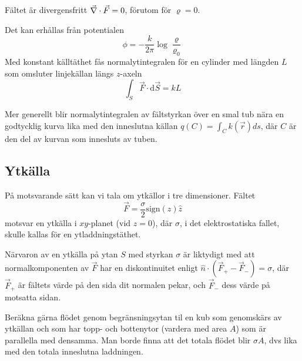 \documentclass[%
oneside,                 %
final,                   %
10pt]{article}
\newenvironment{warning_mdfboxadmon}[1][]{
\begin{warning_mdfboxmdframed}[frametitle=#1]
}
{
\end{warning_mdfboxmdframed}
}
\begin{document}
Fältet är divergensfritt $\vec{\nabla} \cdot \vec{F} = 0$, förutom för $\varrho=0$.

Det kan erhållas från potentialen 
\begin{equation}
	\phi=-\frac{k}{2\pi}\log\frac{\varrho}{\varrho_0}
\end{equation}
Med konstant källtäthet fås normalytintegralen för en cylinder med längden $L$ som omsluter linjekällan längs $z$-axeln
\begin{equation}
	\int_S \vec{F} \cdot \mbox{d}\vec{S} = k L
\end{equation}


\begin{warning_mdfboxadmon}[Kommentar]
Mer generellt blir normalytintegralen av fältstyrkan över en smal tub nära en godtycklig kurva lika med den inneslutna källan $q(C)=\int_C k(\vec{r}) ds$, där $C$ är den del av kurvan som innesluts av tuben.
\end{warning_mdfboxadmon} %



\subsection*{Ytkälla}

På motsvarande sätt kan vi tala om ytkällor i tre dimensioner. Fältet 
\begin{equation} 
\vec F=\frac{\sigma}{2}\mathrm{sign}(z)\hat{z}
\end{equation}
motsvar en ytkälla i $xy$-planet (vid $z=0$), där $\sigma$, i det elektrostatiska fallet, skulle kallas för en ytladdningstäthet.

Närvaron av en ytkälla på ytan $S$ med styrkan $\sigma$ är liktydigt med att
normalkomponenten av $\vec F$ har en diskontinuitet enligt $\hat n\cdot(\vec F_+-\vec F_-)=\sigma$, där $\vec F_+$ är fältets värde på den sida dit normalen pekar, och $\vec F_-$ dess värde på motsatta sidan.


\begin{warning_mdfboxadmon}[Beräkna]
Beräkna gärna flödet genom begränsningsytan til en kub som genomskärs av ytkällan och som har topp- och bottenytor (vardera med area $A$) som är parallella med densamma. Man borde finna att det totala flödet blir $\sigma A$, dvs lika med den totala inneslutna laddningen.
\end{warning_mdfboxadmon} %
\end{document}
